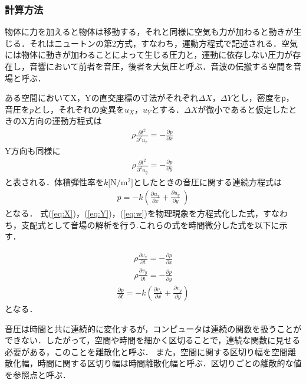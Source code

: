 \documentclass[a4j,12pt]{jsarticle}
\begin{document}
\subsubsection{計算方法}
物体に力を加えると物体は移動する，それと同様に空気も力が加わると動きが生じる．それはニュートンの第2方式，すなわち，運動方程式で記述される．空気には物体に動きが加わることによって生じる圧力と，運動に依存しない圧力が存在し，音響において前者を音圧，後者を大気圧と呼ぶ．音波の伝搬する空間を音場と呼ぶ．

ある空間においてX，Yの直交座標の寸法がそれぞれ$\Delta X$，$\Delta Y$とし，密度をρ，音圧を$p$とし，それぞれの変異を$u_X$，$u_Y$とする．$\Delta X$が微小であると仮定したときのX方向の運動方程式は
\begin {eqnarray}
\label{eq:X}
\rho \frac {\partial t^2} {  \partial ^2 u_x } = - \frac { \partial p } { \partial x} \
\end{eqnarray}
Y方向も同様に
\begin {eqnarray}
\label{eq:Y}
\rho \frac {\partial t^2} {  \partial ^2 u_y } = - \frac { \partial p } { \partial y } \
\end{eqnarray}
と表される．体積弾性率を$k[\mathrm{N/m^2]}$としたときの音圧に関する連続方程式は
\begin {eqnarray}
\label{eq:w}
p = -k ( \frac { \partial u _ x } { \partial x } + \frac { \partial u_y } { \partial y } \ )
\end{eqnarray}
となる．
式(\ref{eq:X})，(\ref{eq:Y})，(\ref{eq:w})を物理現象を方程式化した式，すなわち，支配式として音場の解析を行う.これらの式を時間微分した式を以下に示す．

\begin {eqnarray}
\label{eq :  X-2}
\rho \frac{ \partial v_x } { \partial t } = - \frac { \partial p }{ \partial x }
\end{eqnarray}
\begin {eqnarray}
\label{eq :Y-2}
\rho \frac{ \partial v_y } { \partial t } = - \frac { \partial p }{ \partial y }
\end{eqnarray}
\begin {eqnarray}
\label{eq :  w-2}
\frac{ \partial p } { \partial t } = - k ( \frac { \partial v_x }{ \partial x } + \frac { \partial v_y }{ \partial y } ) 
\end{eqnarray}
となる．

音圧は時間と共に連続的に変化するが，コンピュータは連続の関数を扱うことができない．したがって，空間や時間を細かく区切ることで，連続な関数に見せる必要がある，このことを離散化と呼ぶ．
また，空間に関する区切り幅を空間離散化幅，時間に関する区切り幅は時間離散化幅と呼ぶ．区切りごとの離散的な値を参照点と呼ぶ．
\end{document}
